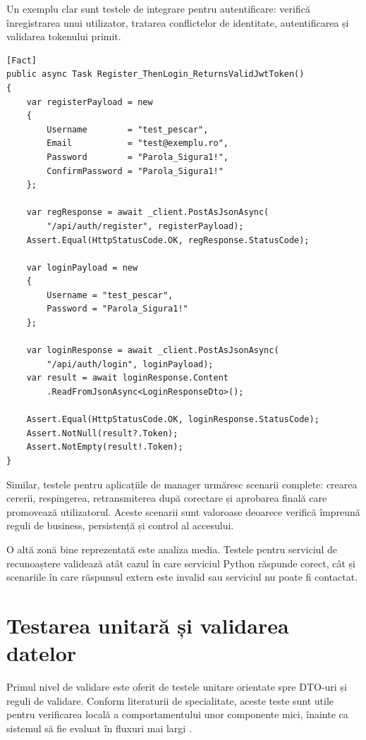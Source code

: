Un exemplu clar sunt testele de integrare pentru autentificare: verifică înregistrarea unui utilizator, tratarea conflictelor de identitate, autentificarea și validarea tokenului primit.

\begin{lstlisting}[language={[Sharp]C}, caption={Test de integrare: înregistrare urmată de autentificare și validarea tokenului JWT}]
[Fact]
public async Task Register_ThenLogin_ReturnsValidJwtToken()
{
    var registerPayload = new
    {
        Username        = "test_pescar",
        Email           = "test@exemplu.ro",
        Password        = "Parola_Sigura1!",
        ConfirmPassword = "Parola_Sigura1!"
    };

    var regResponse = await _client.PostAsJsonAsync(
        "/api/auth/register", registerPayload);
    Assert.Equal(HttpStatusCode.OK, regResponse.StatusCode);

    var loginPayload = new
    {
        Username = "test_pescar",
        Password = "Parola_Sigura1!"
    };

    var loginResponse = await _client.PostAsJsonAsync(
        "/api/auth/login", loginPayload);
    var result = await loginResponse.Content
        .ReadFromJsonAsync<LoginResponseDto>();

    Assert.Equal(HttpStatusCode.OK, loginResponse.StatusCode);
    Assert.NotNull(result?.Token);
    Assert.NotEmpty(result!.Token);
}
\end{lstlisting}

Similar, testele pentru aplicațiile de manager urmăresc scenarii complete: crearea cererii, respingerea, retransmiterea după corectare și aprobarea finală care promovează utilizatorul. Aceste scenarii sunt valoroase deoarece verifică împreună reguli de business, persistență și control al accesului.

O altă zonă bine reprezentată este analiza media. Testele pentru serviciul de recunoaștere validează atât cazul în care serviciul Python răspunde corect, cât și scenariile în care răspunsul extern este invalid sau serviciul nu poate fi contactat.

\section{Testarea unitară și validarea datelor}

Primul nivel de validare este oferit de testele unitare orientate spre DTO-uri și reguli de validare. Conform literaturii de specialitate, aceste teste sunt utile pentru verificarea locală a comportamentului unor componente mici, înainte ca sistemul să fie evaluat în fluxuri mai largi \citep{myers2011}.

